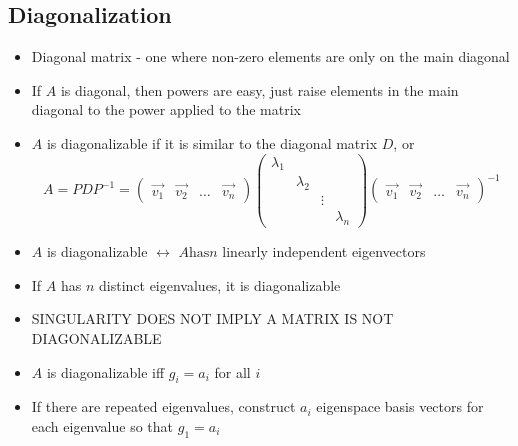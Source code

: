 \documentclass{article}
\begin{document}
\subsection{Diagonalization}
\begin{itemize}
    \item Diagonal matrix - one where non-zero elements are only on the main diagonal 
    \item If \(A\) is diagonal, then powers are easy, just raise elements in the main diagonal to the power applied to the matrix 
    \item \(A\) is diagonalizable if it is similar to the diagonal matrix \(D\), or 
    \[A=PDP^{-1}=\begin{pmatrix} \vec{v_1} & \vec{v_2} & \dots & \vec{v_n} \end{pmatrix}
    \begin{pmatrix} \lambda_1&&& \\ &\lambda_2&& \\ &&\vdots& \\ &&&\lambda_n \end{pmatrix}
    \begin{pmatrix} \vec{v_1} & \vec{v_2} & \dots & \vec{v_n} \end{pmatrix}^{-1}\]
    \item \(A\) is diagonalizable \(\leftrightarrow\) \(A \mbox{has} n\) linearly independent eigenvectors 
    \item If \(A\) has \(n\) distinct eigenvalues, it is diagonalizable 
    \item SINGULARITY DOES NOT IMPLY A MATRIX IS NOT DIAGONALIZABLE 
    \item \(A\) is diagonalizable iff \(g_i=a_i\) for all \(i\) 
    \item If there are repeated eigenvalues, construct \(a_i\) eigenspace basis vectors for each eigenvalue so that \(g_1=a_i\)
\end{itemize}
\end{document}
